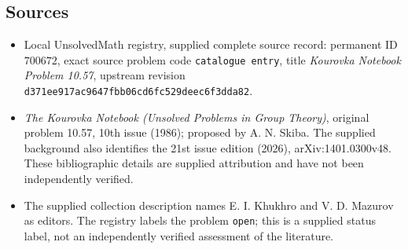 \documentclass[11pt]{article}
\begin{document}
\subsection{Sources}
\begin{itemize}
\item Local UnsolvedMath registry, supplied complete source record: permanent ID \(700672\), exact source problem code \texttt{catalogue entry}, title \emph{Kourovka Notebook Problem 10.57}, upstream revision \texttt{d371ee917ac9647fbb06cd6fc529deec6f3dda82}.
\item \emph{The Kourovka Notebook (Unsolved Problems in Group Theory)}, original problem 10.57, 10th issue (1986); proposed by A. N. Skiba. The supplied background also identifies the 21st issue edition (2026), arXiv:1401.0300v48. These bibliographic details are supplied attribution and have not been independently verified.
\item The supplied collection description names E. I. Khukhro and V. D. Mazurov as editors. The registry labels the problem \texttt{open}; this is a supplied status label, not an independently verified assessment of the literature.
\end{itemize}
\end{document}
